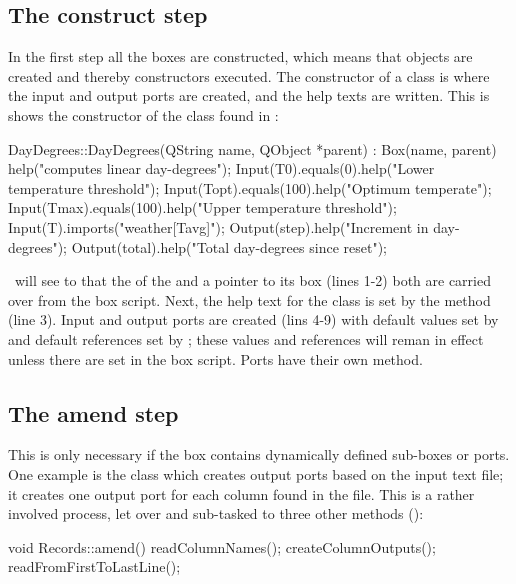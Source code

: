 \subsection{The construct step}
In the first step all the boxes are constructed, which means that  objects are created and thereby constructors executed. The constructor of a  class is where the input and output ports are created, and the help texts are written. This is shows the constructor of the  class found in :

\lstset{numbers=left}
\begin{cpp}
DayDegrees::DayDegrees(QString name, QObject *parent)
    : Box(name, parent) {
	help("computes linear day-degrees");
	Input(T0).equals(0).help("Lower temperature threshold");
	Input(Topt).equals(100).help("Optimum temperate");
	Input(Tmax).equals(100).help("Upper temperature threshold");
	Input(T).imports("weather[Tavg]");
	Output(step).help("Increment in day-degrees");
	Output(total).help("Total day-degrees since reset");
}
\end{cpp}
\lstset{numbers=none}

\US\ will see to that the  of the  and a pointer to its  box (lines 1-2) both are carried over from the box script. Next, the help text for the  class is set by the  method (line 3). Input and output ports are created (lins 4-9) with default values set by  and default references set by ; these values and references will reman in effect unless there are set in the box script. Ports have their own  method.

\subsection{The amend step}
This is only necessary if the box contains dynamically defined sub-boxes or ports. One example is the  class which creates output ports based on the input text file; it creates one output port for each column found in the file. This is a rather involved process, let over and sub-tasked to three other methods ():

\begin{cpp}
void Records::amend() {
	readColumnNames();
	createColumnOutputs();
	readFromFirstToLastLine();
}
\end{cpp}

